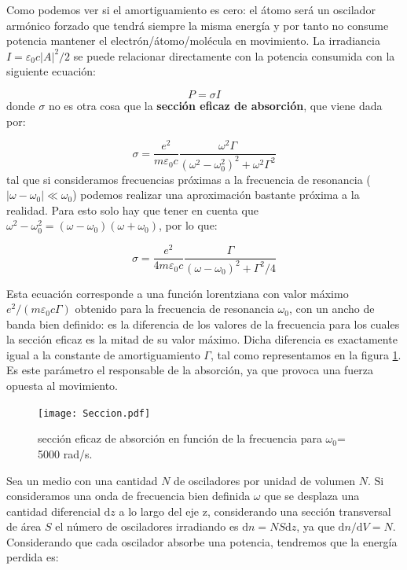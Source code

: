 \documentclass[12pt,a4paper]{article}
\newcommand{\D}{\mathrm{d}}
\numberwithin{equation}{section}
\numberwithin{figure}{section}
\begin{document}
Como podemos ver si el amortiguamiento es cero: el átomo será un oscilador armónico forzado que tendrá siempre la misma energía y por tanto no consume potencia mantener el electrón/átomo/molécula en movimiento. La irradiancia $I=\varepsilon_0 c |A|^2 / 2$ se puede relacionar directamente con la potencia consumida con la siguiente ecuación:

\begin{equation}
P = \sigma I
\end{equation}
donde $\sigma$ no es otra cosa que la \textbf{sección eficaz de absorción}, que viene dada por:

\begin{equation}
\sigma = \dfrac{e^2}{m \varepsilon_0 c} \dfrac{\omega^2 \Gamma}{(\omega^2-\omega_0^2)^2 + \omega^2 \Gamma^2}
\end{equation}
tal que si consideramos frecuencias próximas a la frecuencia de resonancia ( $|\omega-\omega_0| \ll \omega_0$) podemos realizar una aproximación bastante próxima a la realidad. Para esto solo hay que tener en cuenta que $\omega^2-\omega_0^2=(\omega-\omega_0)(\omega+\omega_0)$, por lo que:

\begin{equation}
\sigma = \dfrac{e^2}{4 m \varepsilon_0 c} \dfrac{ \Gamma}{(\omega - \omega_0)^2 +  \Gamma^2/4}
\end{equation}

Esta ecuación corresponde a una función lorentziana con valor máximo $e^2 / (m \varepsilon_0 c \Gamma)$ obtenido para la frecuencia de resonancia $\omega_0$, con un ancho de banda bien definido: es la diferencia de los valores de la frecuencia para los cuales la sección eficaz es la mitad de su valor máximo. Dicha diferencia es exactamente igual a la constante de amortiguamiento $\Gamma$, tal como representamos en la figura \ref{Fig:7.3.02}. Es este parámetro el responsable de la absorción, ya que provoca una fuerza opuesta al movimiento. \\

\begin{figure}[h!] \centering
\texttt{[image: Seccion.pdf]}
\caption{sección eficaz de absorción en función de la frecuencia para $\omega_0$= 5000 rad/s.}
\label{Fig:7.3.02}
\end{figure}

Sea un medio con una cantidad $N$ de osciladores por unidad de volumen $N$. Si consideramos una onda de frecuencia bien definida $\omega$ que se desplaza una cantidad diferencial $\D z$ a lo largo del eje z, considerando una sección transversal de área $S$ el número de osciladores irradiando es $\D n = N S \D z$, ya que $\D n / \D V = N$. Considerando que cada oscilador absorbe una potencia, tendremos que la energía perdida es:
\end{document}
